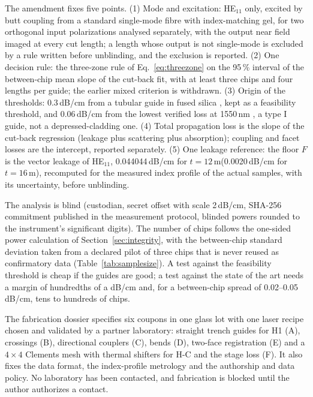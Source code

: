 \documentclass[11pt,a4paper]{article}
\newcommand{\dBcm}{\,dB/cm\xspace}
\newcommand{\um}{\,\textmu m\xspace}
\begin{document}
The amendment fixes five points. (1) Mode and excitation: HE$_{11}$ only, excited by butt coupling from a standard single-mode fibre with index-matching gel, for two orthogonal input polarizations analysed separately, with the output near field imaged at every cut length; a length whose output is not single-mode is excluded by a rule written before unblinding, and the exclusion is reported. (2) One decision rule: the three-zone rule of Eq.~\eqref{eq:threezone} on the 95\,\% interval of the between-chip mean slope of the cut-back fit, with at least three chips and four lengths per guide; the earlier mixed criterion is withdrawn. (3) Origin of the thresholds: 0.3\dBcm from a tubular guide in fused silica \cite{Bukharin2015}, kept as a feasibility threshold, and 0.06\dBcm from the lowest verified loss at 1550\,nm \cite{Ackermann2025}, a type I guide, not a depressed-cladding one. (4) Total propagation loss is the slope of the cut-back regression (leakage plus scattering plus absorption); coupling and facet losses are the intercept, reported separately. (5) One leakage reference: the floor $F$ is the vector leakage of HE$_{11}$, 0.044044\dBcm for $t=12$\um (0.0020\dBcm for $t=16$\um), recomputed for the measured index profile of the actual samples, with its uncertainty, before unblinding.

The analysis is blind (custodian, secret offset with scale 2\dBcm, SHA-256 commitment published in the measurement protocol, blinded powers rounded to the instrument's significant digits). The number of chips follows the one-sided power calculation of Section~\ref{sec:integrity}, with the between-chip standard deviation taken from a declared pilot of three chips that is never reused as confirmatory data (Table~\ref{tab:samplesize}). A test against the feasibility threshold is cheap if the guides are good; a test against the state of the art needs a margin of hundredths of a dB/cm and, for a between-chip spread of 0.02--0.05\dBcm, tens to hundreds of chips.

The fabrication dossier specifies six coupons in one glass lot with one laser recipe chosen and validated by a partner laboratory: straight trench guides for H1 (A), crossings (B), directional couplers (C), bends (D), two-face registration (E) and a $4\times4$ Clements mesh with thermal shifters for H-C and the stage loss (F). It also fixes the data format, the index-profile metrology and the authorship and data policy. No laboratory has been contacted, and fabrication is blocked until the author authorizes a contact.
\end{document}
